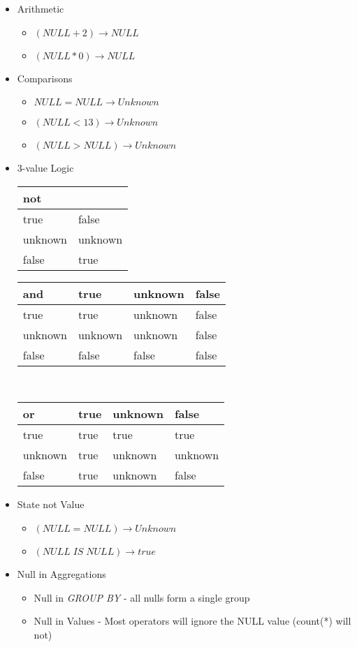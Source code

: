 \begin{itemize}
\item Arithmetic \begin{itemize}
\item $(NULL + 2) \to NULL$
\item $(NULL *0) \to NULL$
\end{itemize}
\item Comparisons\begin{itemize}
\item $NULL = NULL \to Unknown$
\item $(NULL < 13) \to Unknown$
\item $(NULL > NULL) \to Unknown$
\end{itemize}
\item 3-value Logic\vspace{.2cm}\\
\begin{minipage}[t]{.3\textwidth}
\begin{tabular}{|l|l|}
\hline
\textbf{not} &            \\ \hline
true         & false     \\ \hline
unknown      & unknown  \\ \hline
false        & true     \\ \hline
\end{tabular}
\end{minipage}
\begin{minipage}[t]{.3\textwidth}
\begin{tabular}{|l|l|l|l|}
\hline
\textbf{and} & true & unknown & false \\ \hline
true & true & unknown & false \\ \hline
unknown & unknown & unknown & false \\ \hline
false & false & false & false \\ \hline
\end{tabular}\vspace{.2cm}\\
\begin{tabular}{|l|l|l|l|}
\hline
\textbf{or} & true & unknown & false \\ \hline
true & true & true & true \\ \hline
unknown & true & unknown & unknown \\ \hline
false & true & unknown & false \\ \hline
\end{tabular}
\end{minipage}
\item State not Value\begin{itemize}
\item $(NULL = NULL) \to Unknown$
\item $(NULL\;IS\;NULL) \to true$
\end{itemize}
\item Null in Aggregations \begin{itemize}
\item Null in \textit{GROUP BY} - all nulls form a single group
\item Null in Values - Most operators will ignore the NULL value (count(*) will not)
\end{itemize}
\end{itemize}
